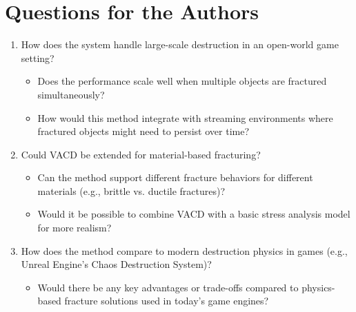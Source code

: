 \documentclass[12pt]{article}
\begin{document}
\section{Questions for the Authors}
\begin{enumerate}[noitemsep]
    \item How does the system handle large-scale destruction in an open-world game setting?
    \begin{itemize}[noitemsep]
        \item Does the performance scale well when multiple objects are fractured simultaneously?
        \item How would this method integrate with streaming environments where fractured objects might need to persist over time?
    \end{itemize}
    \item Could VACD be extended for material-based fracturing?
    \begin{itemize}[noitemsep]
        \item Can the method support different fracture behaviors for different materials (e.g., brittle vs. ductile fractures)?
        \item Would it be possible to combine VACD with a basic stress analysis model for more realism?
    \end{itemize}
    \item How does the method compare to modern destruction physics in games (e.g., Unreal Engine's Chaos Destruction System)?
    \begin{itemize}[noitemsep]
        \item Would there be any key advantages or trade-offs compared to physics-based fracture solutions used in today's game engines?
    \end{itemize}
\end{enumerate}
\end{document}
